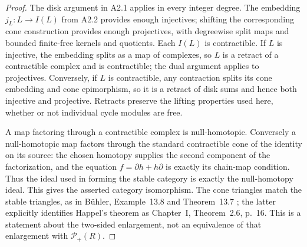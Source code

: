 \begin{proof}
The disk argument in A2.1 applies in every integer degree.  The
embedding $j_L:L\to I(L)$ from A2.2 provides enough injectives;
shifting the corresponding cone construction provides enough
projectives, with degreewise split maps and bounded finite-free
kernels and quotients.  Each $I(L)$ is contractible.  If $L$ is
injective, the embedding splits as a map of complexes, so $L$ is a
retract of a contractible complex and is contractible; the dual
argument applies to projectives.  Conversely, if $L$ is
contractible, any contraction splits its cone embedding and cone
epimorphism, so it is a retract of disk sums and hence both
injective and projective.  Retracts preserve the lifting properties
used here, whether or not individual cycle modules are free.

A map factoring through a contractible complex is null-homotopic.
Conversely a null-homotopic map factors through the standard
contractible cone of the identity on its source: the chosen
homotopy supplies the second component of the factorization, and
the equation $f=\partial h+h\partial$ is exactly its chain-map
condition.  Thus the ideal used in forming the stable category is
exactly the null-homotopy ideal.  This gives the asserted category
isomorphism.  The cone triangles match the stable triangles,
as in B\"uhler, Example~13.8 and Theorem~13.7
\cite{BuehlerExact}; the latter explicitly identifies Happel's
theorem as Chapter~I, Theorem~2.6, p.~16.  This is a statement about
the two-sided enlargement, not an equivalence of that enlargement
with $\mathcal P_+(R)$.
\end{proof}

